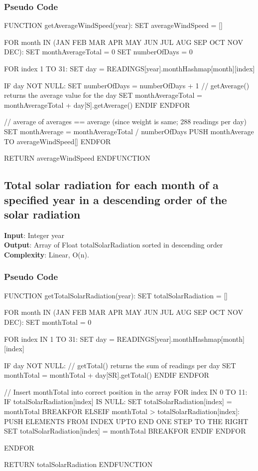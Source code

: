 \documentclass[12pt]{article}
\begin{document}
\subsubsection{Pseudo Code}
\begin{algorithm}[caption={Find average wind speed per month for a given year and return values in the order of month}, label=algo3]
FUNCTION getAverageWindSpeed(year):
	SET averageWindSpeed = []

	FOR month IN (JAN FEB MAR APR MAY JUN JUL AUG SEP OCT NOV DEC):
		SET monthAverageTotal = 0
		SET numberOfDays = 0

		FOR index 1 TO 31:
			SET day = READINGS[year].monthHashmap[month][index]

			IF day NOT NULL:
				SET numberOfDays = numberOfDays + 1
				// getAverage() returns the average value for the day
				SET monthAverageTotal = monthAverageTotal + day[S].getAverage()
			ENDIF
		ENDFOR

		// average of averages == average (since weight is same; 288 readings per day)
		SET monthAverage = monthAverageTotal / numberOfDays
		PUSH monthAverage TO averageWindSpeed[]
	ENDFOR

	RETURN averageWindSpeed
ENDFUNCTION
\end{algorithm}
\subsection{Total solar radiation for each month of a specified year in a descending order of the solar radiation}
\textbf{Input}: Integer year\\
\textbf{Output}: Array of Float totalSolarRadiation sorted in descending order\\
\textbf{Complexity}: Linear, O(n).
\subsubsection{Pseudo Code}
\begin{algorithm}[caption={Return total solar radion of each month in a given year; in descending order.}, label=algo4]
FUNCTION getTotalSolarRadiation(year):
	SET totalSolarRadiation = []

	FOR month IN (JAN FEB MAR APR MAY JUN JUL AUG SEP OCT NOV DEC):
		SET monthTotal = 0

		FOR index IN 1 TO 31:
			SET day = READINGS[year].monthHashmap[month][index]

			IF day NOT NULL:
				// getTotal() returns the sum of readings per day
				SET monthTotal = monthTotal + day[SR].getTotal()
			ENDIF
		ENDFOR

		// Insert monthTotal into correct position in the array
		FOR index IN 0 TO 11:
			IF totalSolarRadiation[index] IS NULL:
				SET totalSolarRadiation[index] = monthTotal
				BREAKFOR
			ELSEIF monthTotal > totalSolarRadiation[index]:
				PUSH ELEMENTS FROM INDEX UPTO END ONE STEP TO THE RIGHT
				SET totalSolarRadiation[index] = monthTotal
				BREAKFOR
			ENDIF
		ENDFOR

	ENDFOR

	RETURN totalSolarRadiation
ENDFUNCTION
\end{algorithm}
\end{document}
